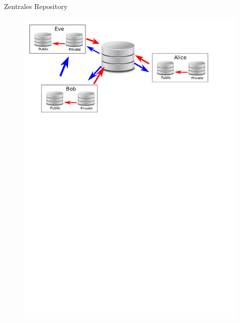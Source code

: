 \documentclass[presentation]{beamer}
\begin{document}
\begin{frame}{Zentrales Repository}
  \begin{figure}
    \centering
    \includegraphics[width=\textwidth]{img/central-setup}
  \end{figure}
\end{frame}
\end{document}
